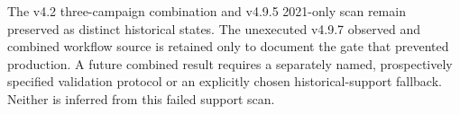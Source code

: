 The v4.2 three-campaign combination and v4.9.5 2021-only scan remain preserved as
distinct historical states.  The unexecuted v4.9.7 observed and combined workflow
source is retained only to document the gate that prevented production.  A future
combined result requires a separately named, prospectively specified validation
protocol or an explicitly chosen historical-support fallback.  Neither is inferred
from this failed support scan.
